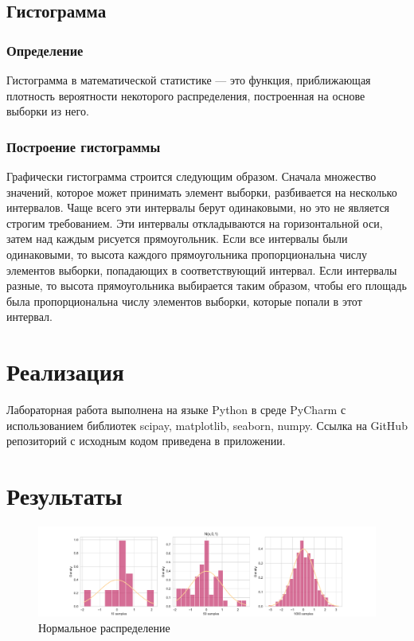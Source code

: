 \documentclass{article}
\begin{document}
\subsection{Гистограмма}
\subsubsection{Определение}
Гистограмма в математической статистике — это функция, приближающая
плотность вероятности некоторого распределения, построенная на основе
выборки из него.
\subsubsection{Построение гистограммы}
Графически гистограмма строится следующим образом. Сначала множество значений, которое может принимать элемент выборки, разбивается на
несколько интервалов. Чаще всего эти интервалы берут одинаковыми, но
это не является строгим требованием. Эти интервалы откладываются на
горизонтальной оси, затем над каждым рисуется прямоугольник. Если все
интервалы были одинаковыми, то высота каждого прямоугольника пропорциональна числу элементов выборки, попадающих в соответствующий интервал. Если интервалы разные, то высота прямоугольника выбирается
таким образом, чтобы его площадь была пропорциональна числу элементов
выборки, которые попали в этот интервал.

\section{Реализация}
Лабораторная работа выполнена на языке Python в среде PyCharm с использованием библиотек scipay, matplotlib, seaborn, numpy.
Ссылка на GitHub репозиторий с исходным кодом приведена в приложении.

\section{Результаты}

\begin{figure}[H]
\begin{center}
\includegraphics[width = 18 cm]{images/normal.pdf}\caption{Нормальное распределение}\label{figure1}
\end{center}
\end{figure}
\end{document}
